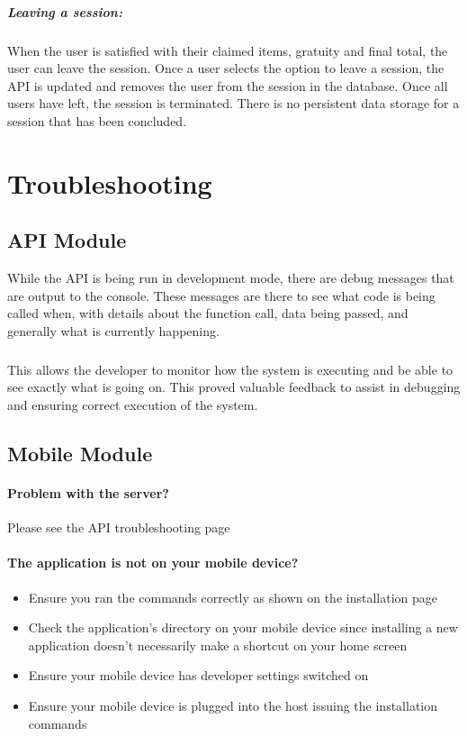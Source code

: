 \documentclass[12pt,a4paper]{article}
\begin{document}
\subparagraph{Leaving a session: }
When the user is satisfied with their claimed items, gratuity and final total, the user can leave the session. Once a user selects the option to leave a session, the API is updated and removes the user from the session in the database. Once all users have left, the session is terminated. There is no persistent data storage for a session that has been concluded.


\section{Troubleshooting}	
   \subsection{API Module}
While the API is being run in development mode, there are debug messages that are output to the console. These messages are there to see what code is being called when, with details about the function call, data being passed, and generally what is currently happening.
\subparagraph{}
This allows the developer to monitor how the system is executing and be able to see exactly what is going on. This proved valuable feedback to assist in debugging and ensuring correct execution of the system.
	
    \subsection{Mobile Module}
 	\paragraph{Problem with the server?}
		Please see the API troubleshooting page
\paragraph{The application is not on your mobile device?}
\begin{itemize}
\item Ensure you ran the commands correctly as shown on the installation page
\item Check the application's directory on your mobile device since installing a new application doesn't necessarily make a shortcut on your home screen
\item Ensure your mobile device has developer settings switched on
\item Ensure your mobile device is plugged into the host issuing the installation commands
\end{itemize} 
\end{document}
